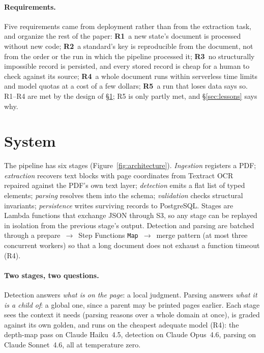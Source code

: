 \documentclass[letterpaper]{article} %
\begin{document}
\paragraph{Requirements.} Five requirements came from deployment rather than
from the extraction task, and organize the rest of the paper:
\textbf{R1}~a new state's document is processed without new code;
\textbf{R2}~a standard's key is reproducible from the document, not from the
order or the run in which the pipeline processed it;
\textbf{R3}~no structurally impossible record is persisted, and every stored
record is cheap for a human to check against its source;
\textbf{R4}~a whole document runs within serverless time limits and model
quotas at a cost of a few dollars;
\textbf{R5}~a run that loses data says so.
R1--R4 are met by the design of \S\ref{sec:method}; R5 is only partly met, and
\S\ref{sec:lessons} says why.

\section{System}
\label{sec:method}



The pipeline has six stages (Figure~\ref{fig:architecture}).
\emph{Ingestion} registers a PDF; \emph{extraction} recovers text blocks with
page coordinates from Textract OCR repaired against the PDF's own text layer;
\emph{detection} emits a flat list of typed elements; \emph{parsing} resolves
them into the schema; \emph{validation} checks structural invariants;
\emph{persistence} writes surviving records to PostgreSQL. Stages are Lambda
functions that exchange JSON through S3, so any stage can be replayed in
isolation from the previous stage's output. Detection and parsing are batched
through a prepare~$\rightarrow$~Step Functions
\texttt{Map}~$\rightarrow$~merge pattern (at most three concurrent workers) so
that a long document does not exhaust a function timeout (R4).

\paragraph{Two stages, two questions.} Detection answers \emph{what is on the
page}: a local judgment. Parsing answers \emph{what it is a child of}: a global
one, since a parent may be printed pages earlier. Each stage sees the context
it needs (parsing reasons over a whole domain at once), is graded against its
own golden, and runs on the cheapest adequate model (R4): the depth-map pass on
Claude Haiku~4.5, detection on Claude Opus~4.6, parsing on Claude Sonnet~4.6,
all at temperature zero.
\end{document}
